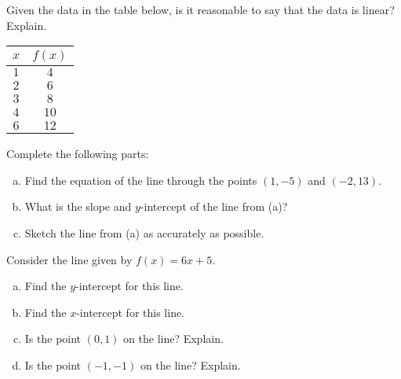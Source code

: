 \documentclass[11pt,letterpaper]{article}
\begin{document}
\vfill
\newpage



 Given the data in the table below, is it reasonable to say that the data is linear? Explain. 
	\begin{table}[!ht]
	\centering
	\begin{tabular}{c|c}
	$x$ & $f(x)$ \\ \hline
	$1$ & $4$ \\
	$2$ & $6$ \\
	$3$ & $8$ \\
	$4$ & $10$ \\
	$6$ & $12$ 
	\end{tabular}
	\end{table}



\newpage



 Complete the following parts: 
\begin{enumerate}[(a)]
\item Find the equation of the line through the points $(1, -5)$ and $(-2, 13)$. \vfill
\item What is the slope and $y$-intercept of the line from (a)? \vfill
\item Sketch the line from (a) as accurately as possible. \vfill
\end{enumerate}



\newpage



 Consider the line given by $f(x)= 6x + 5$.
        \begin{enumerate}[(a)]
        \item Find the $y$-intercept for this line. \vfill
        \item Find the $x$-intercept for this line. \vfill
        \item Is the point $(0, 1)$ on the line? Explain. \vfill
        \item Is the point $(-1, -1)$ on the line? Explain. \vfill
        \end{enumerate}
\end{document}
